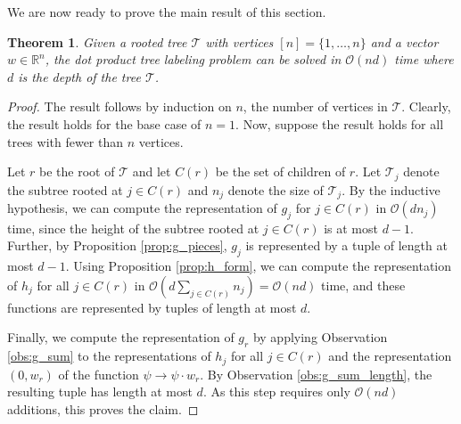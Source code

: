 \documentclass[10pt]{article}
\newtheorem{theorem}{Theorem}
\newcommand{\tree}{\mathcal{T}}
\begin{document}
We are now ready to prove the main result of this section.
\begin{theorem}
    Given a rooted tree $\tree$ with vertices $[n] = \{1, \ldots, n\}$ and a vector $w \in \mathbb{R}^n$, the 
    dot product tree labeling problem can be solved in $\mathcal{O}(nd)$ time where $d$ is the depth of the tree $\tree$.
\end{theorem}
\begin{proof}
    The result follows by induction on $n$, the number of vertices in $\tree$. Clearly, the result holds for the base
    case of $n = 1$. Now, suppose the result holds for all trees with fewer than $n$ vertices.

    Let $r$ be the root of $\tree$ and let $C(r)$ be the set of children of $r$. Let $\tree_j$ denote the subtree rooted at
    $j \in C(r)$ and $n_j$ denote the size of $\tree_j$. By the inductive hypothesis, we can compute
    the representation of $g_j$ for $j \in C(r)$ in $\mathcal{O}(dn_j)$ time, since the height of the subtree rooted at 
    $j \in C(r)$ is at most $d - 1$. Further, by Proposition \ref{prop:g_pieces}, $g_j$ is represented by a 
    tuple of length at most $d - 1$. Using Proposition \ref{prop:h_form}, we can compute the representation of $h_j$ for all
    $j \in C(r)$ in $\mathcal{O}(d\sum_{j\in C(r)}n_j) = \mathcal{O}(nd)$ time, and these functions are represented by tuples of length at most $d$.

    Finally, we compute the representation of $g_r$ by applying Observation \ref{obs:g_sum} to the representations of 
    $h_j$ for all $j \in C(r)$ and the representation $(0, w_r)$ of the function $\psi \rightarrow \psi\cdot w_r$. 
    By Observation \ref{obs:g_sum_length}, the resulting tuple has 
    length at most $d$. As this step requires only $\mathcal{O}(nd)$ additions, this proves the claim.
\end{proof}

\newpage



\newpage
\appendix
\end{document}
